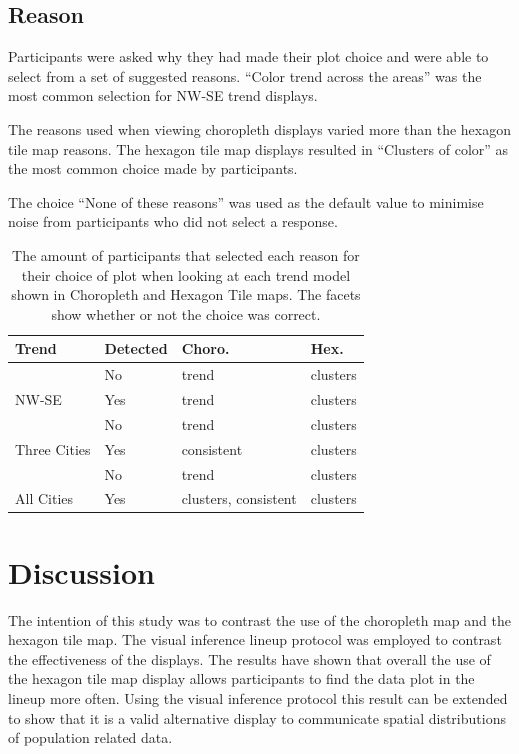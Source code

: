 \documentclass[conference,final,]{IEEEtran}
\begin{document}
\hypertarget{reason}{%
\subsection{Reason}\label{reason}}

Participants were asked why they had made their plot choice and were able to select from a set of suggested reasons.
``Color trend across the areas'' was the most common selection for NW-SE trend displays.

The reasons used when viewing choropleth displays varied more than the hexagon tile map reasons.
The hexagon tile map displays resulted in ``Clusters of color'' as the most common choice made by participants.

The choice ``None of these reasons'' was used as the default value to minimise noise from participants who did not select a response.

\begin{table}

\caption{\label{tab:reason}The amount of participants that selected each reason for their choice of plot when looking at each trend model shown in Choropleth and Hexagon Tile maps. The facets show whether or not the choice was correct.}
\centering
\begin{tabular}[t]{llll}
\toprule
Trend & Detected & Choro. & Hex.\\
\midrule
 & No & trend & clusters\\
\cmidrule{2-4}
\multirow{-2}{*}{\raggedright\arraybackslash NW-SE} & Yes & trend & clusters\\
\cmidrule{1-4}
 & No & trend & clusters\\
\cmidrule{2-4}
\multirow{-2}{*}{\raggedright\arraybackslash Three Cities} & Yes & consistent & clusters\\
\cmidrule{1-4}
 & No & trend & clusters\\
\cmidrule{2-4}
\multirow{-2}{*}{\raggedright\arraybackslash All Cities} & Yes & clusters, consistent & clusters\\
\bottomrule
\end{tabular}
\end{table}

\hypertarget{discussion}{%
\section{Discussion}\label{discussion}}

The intention of this study was to contrast the use of the choropleth map and the hexagon tile map.
The visual inference lineup protocol was employed to contrast the effectiveness of the displays.
The results have shown that overall the use of the hexagon tile map display allows participants to find the data plot in the lineup more often.
Using the visual inference protocol this result can be extended to show that it is a valid alternative display to communicate spatial distributions of population related data.
\end{document}
